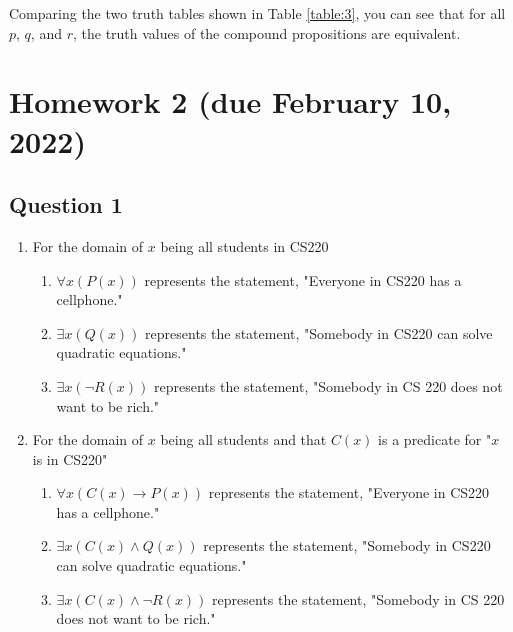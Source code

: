\documentclass[letterpaper, 12pt]{article}
\begin{document}
Comparing the two truth tables shown in Table \ref{table:3}, you can see that for all $p$, $q$, and $r$, the truth values of the compound propositions are equivalent.

\section*{Homework 2 (due February 10, 2022)}

\subsection*{Question 1}
\begin{enumerate}
    \item For the domain of $x$ being all students in CS220
    \begin{enumerate}
        \item $\forall x(P(x))$ represents the statement, "Everyone in CS220 has a cellphone."
        \item $\exists x(Q(x))$ represents the statement, "Somebody in CS220 can solve quadratic equations."
        \item $\exists x(\neg R(x))$ represents the statement, "Somebody in CS 220 does not want to be rich."
    \end{enumerate}
    \item For the domain of $x$ being all students and that $C(x)$ is a predicate for "$x$ is in CS220" 
    \begin{enumerate}
        \item $\forall x(C(x) \to P(x))$ represents the statement, "Everyone in CS220 has a cellphone."
        \item $\exists x(C(x) \land Q(x))$ represents the statement, "Somebody in CS220 can solve quadratic equations."
        \item $\exists x(C(x) \land \neg R(x))$ represents the statement, "Somebody in CS 220 does not want to be rich."
    \end{enumerate}
\end{enumerate}
\end{document}
